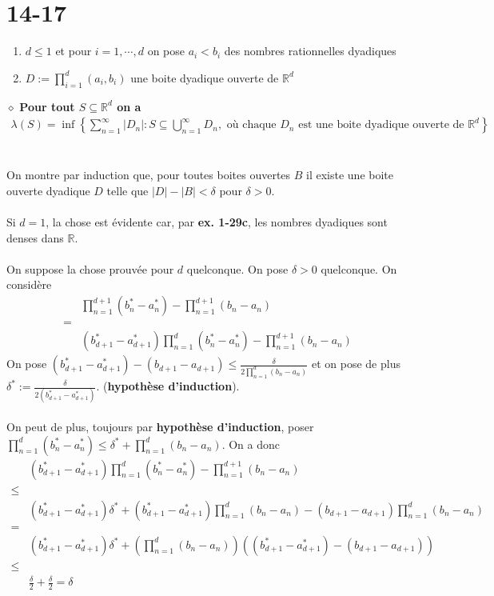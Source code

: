 \documentclass[a4paper,10pt]{article}
\begin{document}
\section*{14-17}
\begin{enumerate}
	\item $d \leq 1$ et pour $i = 1, \cdots ,d $ on pose $a_i < b_i$ des nombres rationnelles dyadiques
	\item $D := \prod_{i=1}^d (a_i, b_i)$ une boite dyadique ouverte de $\mathbb{R}^d$
\end{enumerate}
$\diamond$ \textbf{Pour tout $S \subseteq \mathbb{R}^d$ on a }
\begin{align*}
	\lambda (S) = \inf \left\{ \sum_{n=1}^\infty |D_n| : S \subseteq \bigcup_{n=1}^\infty D_n, \text{ où chaque } D_n \text{ est une boite dyadique ouverte de } \mathbb{R}^d \right\}	
\end{align*}
\\
\\
On montre par induction que, pour toutes boites ouvertes $B$ il existe une boite ouverte dyadique $D$ telle que $|D| - |B| < \delta$ pour $\delta > 0$.
\\
\\
Si $d = 1$, la chose est évidente car, par \textbf{ex. 1-29c}, les nombres dyadiques sont denses dans $\mathbb{R}$.
\\
\\
On suppose la chose prouvée pour $d$ quelconque. On pose $\delta > 0$ quelconque. On considère
\begin{align*}
	& \prod_{n=1}^{d+1} (b^*_n - a^*_n) - \prod_{n=1}^{d+1} (b_n - a_n) \\
 	= \\
 	& (b^*_{d+1} - a^*_{d+1})\prod_{n=1}^d (b^*_n - a^*_n) - \prod_{n=1}^{d+1} (b_n - a_n)
\end{align*}
On pose $(b^*_{d+1} - a^*_{d+1}) - (b_{d+1} - a_{d+1}) \leq \frac{\delta}{2 \prod_{n=1}^d (b_n - a_n)}$ et on pose de plus $\delta^* := \frac{\delta}{2(b^*_{d+1} - a^*_{d+1})}$. (\textbf{hypothèse d'induction}).
\\
\\
On peut de plus, toujours par \textbf{hypothèse d'induction}, poser $\prod_{n=1}^d (b^*_n - a^*_n) \leq \delta^* + \prod_{n=1}^d (b_n - a_n)$. On a donc
\begin{align*}
	& (b^*_{d+1} - a^*_{d+1})\prod_{n=1}^d (b^*_n - a^*_n) - \prod_{n=1}^{d+1} (b_n - a_n) \\
	\leq \\
	& (b^*_{d+1} - a^*_{d+1})\delta^* + (b^*_{d+1} - a^*_{d+1})\prod_{n=1}^d (b_n - a_n) - (b_{d+1} - a_{d+1})\prod_{n=1}^d (b_n - a_n) \\
	= \\
	& (b^*_{d+1} - a^*_{d+1})\delta^* + \left( \prod_{n=1}^d (b_n - a_n)\right) ((b^*_{d+1} - a^*_{d+1}) - (b_{d+1} - a_{d+1})) \\
	\leq \\
	& \frac{\delta}{2} + \frac{\delta}{2} = \delta
\end{align*}
\end{document}
